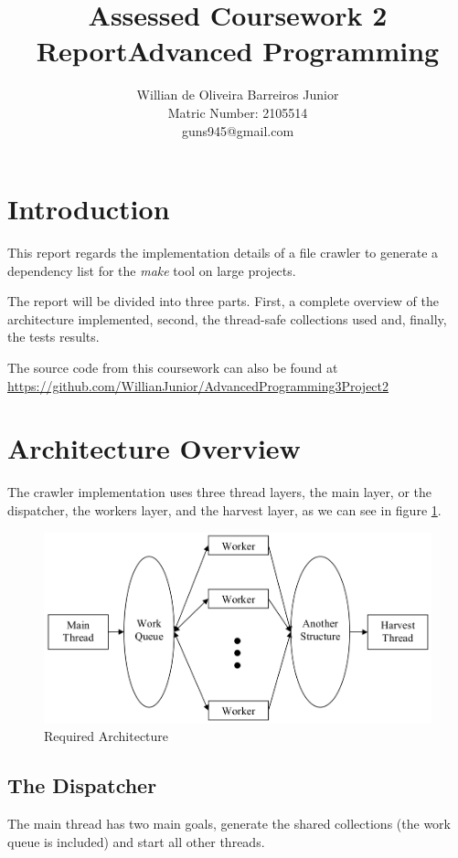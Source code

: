 \documentclass[twocolumn,20pt]{article}
\title{Assessed Coursework 2 Report\linebreak Advanced Programming }
\author{Willian de Oliveira Barreiros Junior\\
Matric Number: 2105514\\
 guns945@gmail.com\\}
\begin{document}
\maketitle

\section{Introduction}
This report regards the implementation details of a file crawler to generate a dependency list for the \textit{make} tool on large projects.

The report will be divided into three parts. First, a complete overview of the architecture implemented, second, the thread-safe collections used and, finally, the tests results.

The source code from this coursework can also be found at
\url{https://github.com/WillianJunior/AdvancedProgramming3Project2}

\section{Architecture Overview}
The crawler implementation uses three thread layers, the main layer, or the dispatcher, the workers layer, and the harvest layer, as we can see in figure \ref{fig:arch}.

\begin{figure}[h]
\centering
\includegraphics[scale=0.20]{arch.png}
\caption{Required Architecture}
\label{fig:arch}
\end{figure}

\subsection{The Dispatcher}
The main thread has two main goals, generate the shared collections (the work queue is included) and start all other threads. 
\end{document}
